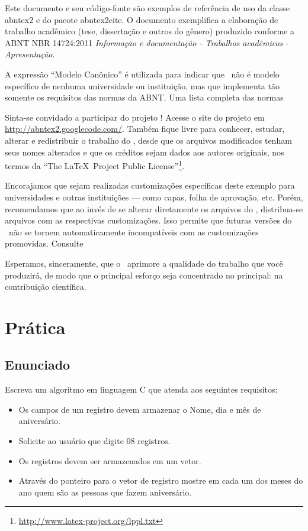 \documentclass[
	12pt,				%
	openright,			%
	oneside,			%
	a4paper,			%
	chapter=TITLE,		%
	section=TITLE,		%
	english,			%
	french,				%
	spanish,			%
	brazil				%
	]{abntex2}
\begin{document}
Este documento e seu código-fonte são exemplos de referência de uso da classe
\textsf{abntex2} e do pacote \textsf{abntex2cite}. O documento 
exemplifica a elaboração de trabalho acadêmico (tese, dissertação e outros do
gênero) produzido conforme a ABNT NBR 14724:2011 \emph{Informação e documentação
- Trabalhos acadêmicos - Apresentação}.

A expressão ``Modelo Canônico'' é utilizada para indicar que \abnTeX\ não é
modelo específico de nenhuma universidade ou instituição, mas que implementa tão
somente os requisitos das normas da ABNT. Uma lista completa das normas

Sinta-se convidado a participar do projeto \abnTeX! Acesse o site do projeto em
\url{http://abntex2.googlecode.com/}. Também fique livre para conhecer,
estudar, alterar e redistribuir o trabalho do \abnTeX, desde que os arquivos
modificados tenham seus nomes alterados e que os créditos sejam dados aos
autores originais, nos termos da ``The \LaTeX\ Project Public
License''\footnote{\url{http://www.latex-project.org/lppl.txt}}.

Encorajamos que sejam realizadas customizações específicas deste exemplo para
universidades e outras instituições --- como capas, folha de aprovação, etc.
Porém, recomendamos que ao invés de se alterar diretamente os arquivos do
\abnTeX, distribua-se arquivos com as respectivas customizações.
Isso permite que futuras versões do \abnTeX~não se tornem automaticamente
incompatíveis com as customizações promovidas. Consulte


Esperamos, sinceramente, que o \abnTeX\ aprimore a qualidade do trabalho que
você produzirá, de modo que o principal esforço seja concentrado no principal:
na contribuição científica.


\chapter{\bfseries{Prática}}


\section{Enunciado}

	Escreva um algoritmo em linguagem C que atenda aos seguintes requisitos:

	\begin{itemize}[itemsep = -1mm]
		\item Os campos de um registro devem armazenar o Nome, dia e mês de aniversário.
		\item Solicite ao usuário que digite 08 registros.
		\item Os registros devem ser armazenados em um vetor.
		\item Através do ponteiro para o vetor de registro mostre em cada um dos meses do ano quem são as pessoas que fazem aniversário.
	\end{itemize}
\end{document}
